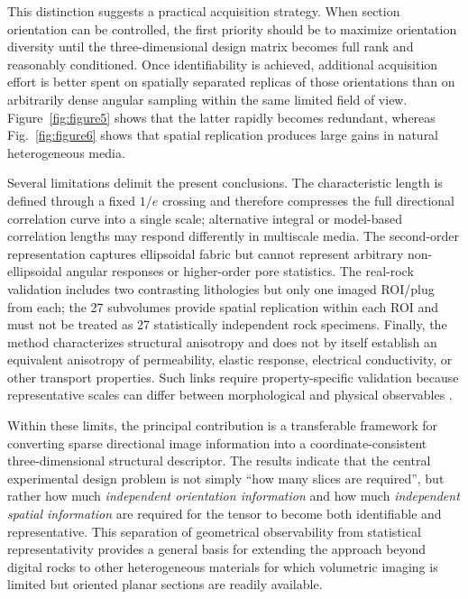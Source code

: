\documentclass{article}
\begin{document}
This distinction suggests a practical acquisition strategy. When section orientation can be controlled, the first priority should be to maximize orientation diversity until the three-dimensional design matrix becomes full rank and reasonably conditioned. Once identifiability is achieved, additional acquisition effort is better spent on spatially separated replicas of those orientations than on arbitrarily dense angular sampling within the same limited field of view. Figure~\ref{fig:figure5} shows that the latter rapidly becomes redundant, whereas Fig.~\ref{fig:figure6} shows that spatial replication produces large gains in natural heterogeneous media.

Several limitations delimit the present conclusions. The characteristic length is defined through a fixed $1/e$ crossing and therefore compresses the full directional correlation curve into a single scale; alternative integral or model-based correlation lengths may respond differently in multiscale media. The second-order representation captures ellipsoidal fabric but cannot represent arbitrary non-ellipsoidal angular responses or higher-order pore statistics. The real-rock validation includes two contrasting lithologies but only one imaged ROI/plug from each; the 27 subvolumes provide spatial replication within each ROI and must not be treated as 27 statistically independent rock specimens. Finally, the method characterizes structural anisotropy and does not by itself establish an equivalent anisotropy of permeability, elastic response, electrical conductivity, or other transport properties. Such links require property-specific validation because representative scales can differ between morphological and physical observables \cite{AlRaoush2010,Zubov2024}.

Within these limits, the principal contribution is a transferable framework for converting sparse directional image information into a coordinate-consistent three-dimensional structural descriptor. The results indicate that the central experimental design problem is not simply ``how many slices are required'', but rather how much \emph{independent orientation information} and how much \emph{independent spatial information} are required for the tensor to become both identifiable and representative. This separation of geometrical observability from statistical representativity provides a general basis for extending the approach beyond digital rocks to other heterogeneous materials for which volumetric imaging is limited but oriented planar sections are readily available.
\end{document}
